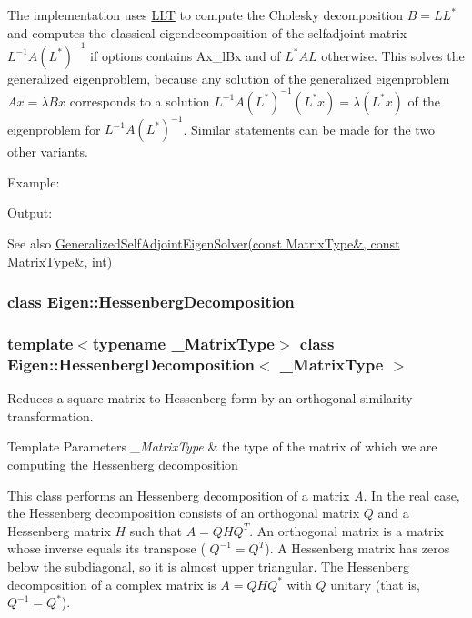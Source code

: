 The implementation uses \hyperlink{group___cholesky___module_class_eigen_1_1_l_l_t}{L\+LT} to compute the Cholesky decomposition $ B = LL^* $ and computes the classical eigendecomposition of the selfadjoint matrix $ L^{-1} A (L^*)^{-1} $ if {\ttfamily options} contains Ax\+\_\+l\+Bx and of $ L^{*} A L $ otherwise. This solves the generalized eigenproblem, because any solution of the generalized eigenproblem $ Ax = \lambda B x $ corresponds to a solution $ L^{-1} A (L^*)^{-1} (L^* x) = \lambda (L^* x) $ of the eigenproblem for $ L^{-1} A (L^*)^{-1} $. Similar statements can be made for the two other variants.

Example\+: 
\begin{DoxyCodeInclude}
\end{DoxyCodeInclude}
 Output\+: 
\begin{DoxyVerbInclude}
\end{DoxyVerbInclude}


\begin{DoxySeeAlso}{See also}
\hyperlink{group___eigenvalues___module_addc0409c9cb1a5ac9cbbd00efe68908e}{Generalized\+Self\+Adjoint\+Eigen\+Solver(const Matrix\+Type\&, const Matrix\+Type\&, int)} 
\end{DoxySeeAlso}
\label{class_eigen_1_1_hessenberg_decomposition}
\subsubsection{class Eigen\+:\+:Hessenberg\+Decomposition}
\subsubsection*{template$<$typename \+\_\+\+Matrix\+Type$>$\newline
class Eigen\+::\+Hessenberg\+Decomposition$<$ \+\_\+\+Matrix\+Type $>$}

Reduces a square matrix to Hessenberg form by an orthogonal similarity transformation. 


\begin{DoxyTemplParams}{Template Parameters}
{\em \+\_\+\+Matrix\+Type} & the type of the matrix of which we are computing the Hessenberg decomposition\\
\hline
\end{DoxyTemplParams}
This class performs an Hessenberg decomposition of a matrix $ A $. In the real case, the Hessenberg decomposition consists of an orthogonal matrix $ Q $ and a Hessenberg matrix $ H $ such that $ A = Q H Q^T $. An orthogonal matrix is a matrix whose inverse equals its transpose ( $ Q^{-1} = Q^T $). A Hessenberg matrix has zeros below the subdiagonal, so it is almost upper triangular. The Hessenberg decomposition of a complex matrix is $ A = Q H Q^* $ with $ Q $ unitary (that is, $ Q^{-1} = Q^* $).

